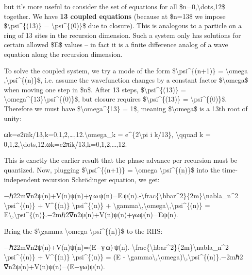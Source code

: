 but it's more useful to consider the set of equations for all
\$n=0,\textbackslash{}dots,12\$ together. We have \textbf{13 coupled
equations} (because at \$n=13\$ we impose
\$\textbackslash{}psi\^{}\{(13)\} = \textbackslash{}psi\^{}\{(0)\}\$ due
to closure)​. This is analogous to a particle on a ring of 13 sites in
the recursion dimension. Such a system only has solutions for certain
allowed \$E\$ values -- in fact it is a finite difference analog of a
wave equation along the recursion dimension.

To solve the coupled system, we try a mode of the form
\$\textbackslash{}psi\^{}\{(n+1)\} = \textbackslash{}omega
,\textbackslash{}psi\^{}\{(n)\}\$, i.e. assume the wavefunction changes
by a constant factor \$\textbackslash{}omega\$ when moving one step in
\$n\$​. After 13 steps, \$\textbackslash{}psi\^{}\{(13)\} =
\textbackslash{}omega\^{}\{13\}\textbackslash{}psi\^{}\{(0)\}\$, but
closure requires \$\textbackslash{}psi\^{}\{(13)\} =
\textbackslash{}psi\^{}\{(0)\}\$. Therefore we must have
\$\textbackslash{}omega\^{}\{13\} = 1\$, meaning
\$\textbackslash{}omega\$ is a 13th root of unity:

ωk=e2πik/13,k=0,1,2,\ldots{},12.\textbackslash{}omega\_k =
e\^{}\{2\textbackslash{}pi i k/13\}, \textbackslash{}qquad k =
0,1,2,\textbackslash{}dots,12.ωk​=e2πik/13,k=0,1,2,\ldots{},12.​

This is exactly the earlier result that the phase advance per recursion
must be quantized. Now, plugging \$\textbackslash{}psi\^{}\{(n+1)\} =
\textbackslash{}omega \textbackslash{}psi\^{}\{(n)\}\$ into the
time-independent recursion Schrödinger equation, we get:

−ℏ22m∇n2ψ(n)+V(n)ψ(n)+γ ω ψ(n)=E ψ(n).-\textbackslash{}frac\{\textbackslash{}hbar\^{}2\}\{2m\}\textbackslash{}nabla\_n\^{}2
\textbackslash{}psi\^{}\{(n)\} + V\^{}\{(n)\}
\textbackslash{}psi\^{}\{(n)\} +
\textbackslash{}gamma\textbackslash{},\textbackslash{}omega\textbackslash{},\textbackslash{}psi\^{}\{(n)\}
=
E\textbackslash{},\textbackslash{}psi\^{}\{(n)\}.−2mℏ2​∇n2​ψ(n)+V(n)ψ(n)+γωψ(n)=Eψ(n).

Bring the \$\textbackslash{}gamma \textbackslash{}omega
\textbackslash{}psi\^{}\{(n)\}\$ to the RHS:

−ℏ22m∇n2ψ(n)+V(n)ψ(n)=(E−γ ω) ψ(n).-\textbackslash{}frac\{\textbackslash{}hbar\^{}2\}\{2m\}\textbackslash{}nabla\_n\^{}2
\textbackslash{}psi\^{}\{(n)\} + V\^{}\{(n)\}
\textbackslash{}psi\^{}\{(n)\} = (E -
\textbackslash{}gamma\textbackslash{},\textbackslash{}omega)\textbackslash{},\textbackslash{}psi\^{}\{(n)\}.−2mℏ2​∇n2​ψ(n)+V(n)ψ(n)=(E−γω)ψ(n).​

